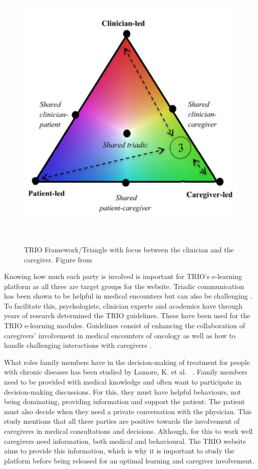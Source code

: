 \documentclass{sigchi}
\begin{document}
\begin{figure}[H]
\centering
  \includegraphics[width=0.9\columnwidth]{figures/Triangle3Screenshot.jpg}
  \caption{TRIO Framework/Triangle with focus between the clinician and the caregiver. Figure from}~\label{fig:CaregiverFocus}
\end{figure}

Knowing how much each party is involved is important for TRIO’s e-learning platform as all three are target groups for the website. Triadic communication has been shown to be helpful in medical encounters but can also be challenging \cite{Laidsaar-Powell2013}. To facilitate this, psychologists, clinician experts and academics have through years of research determined the TRIO guidelines. These have been used for the TRIO e-learning modules. Guidelines consist of enhancing the collaboration of caregivers' involvement in medical encounters of oncology as well as how to handle challenging interactions with caregivers \cite{Laidsaar-Powell2018a} \cite{Laidsaar-Powell2018}.

What roles family members have in the decision-making of treatment for people with chronic diseases has been studied by Lamore, K. et al. ~\cite{Lamore2017}. Family members need to be provided with medical knowledge and often want to participate in decision-making discussions. For this, they must have helpful behaviours, not being dominating, providing information and support the patient. The patient must also decide when they need a private conversation with the physician. This study mentions that all three parties are positive towards the involvement of caregivers in medical consultations and decisions. Although, for this to work well caregivers need information, both medical and behavioural. The TRIO website aims to provide this information, which is why it is important to study the platform before being released for an optimal learning and caregiver involvement. 
\end{document}
